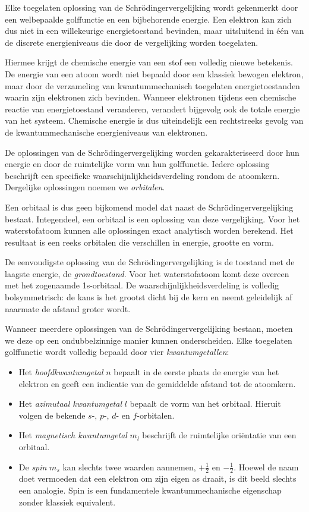 Elke toegelaten oplossing van de Schr\"odingervergelijking wordt gekenmerkt door een welbepaalde golffunctie en een bijbehorende energie. Een elektron kan zich dus niet in een willekeurige energietoestand bevinden, maar uitsluitend in \'e\'en van de discrete energieniveaus die door de vergelijking worden toegelaten.

Hiermee krijgt de chemische energie van een stof een volledig nieuwe betekenis. De energie van een atoom wordt niet bepaald door een klassiek bewogen elektron, maar door de verzameling van kwantummechanisch toegelaten energietoestanden waarin zijn elektronen zich bevinden. Wanneer elektronen tijdens een chemische reactie van energietoestand veranderen, verandert bijgevolg ook de totale energie van het systeem. Chemische energie is dus uiteindelijk een rechtstreeks gevolg van de kwantummechanische energieniveaus van elektronen.

De oplossingen van de Schr\"odingervergelijking worden gekarakteriseerd door hun energie en door de ruimtelijke vorm van hun golffunctie. Iedere oplossing beschrijft een specifieke waarschijnlijkheidsverdeling rondom de atoomkern. Dergelijke oplossingen noemen we \emph{orbitalen}.

Een orbitaal is dus geen bijkomend model dat naast de Schr\"odingervergelijking bestaat. Integendeel, een orbitaal is een oplossing van deze vergelijking. Voor het waterstofatoom kunnen alle oplossingen exact analytisch worden berekend. Het resultaat is een reeks orbitalen die verschillen in energie, grootte en vorm.

De eenvoudigste oplossing van de Schr\"odingervergelijking is de toestand met de laagste energie, de \emph{grondtoestand}. Voor het waterstofatoom komt deze overeen met het zogenaamde 1s-orbitaal. De waarschijnlijkheidsverdeling is volledig bolsymmetrisch: de kans is het grootst dicht bij de kern en neemt geleidelijk af naarmate de afstand groter wordt.

Wanneer meerdere oplossingen van de Schr\"odingervergelijking bestaan, moeten we deze op een ondubbelzinnige manier kunnen onderscheiden. Elke toegelaten golffunctie wordt volledig bepaald door vier \emph{kwantumgetallen}:

\begin{itemize}
\item Het \emph{hoofdkwantumgetal} $n$ bepaalt in de eerste plaats de energie van het elektron en geeft een indicatie van de gemiddelde afstand tot de atoomkern.
\item Het \emph{azimutaal kwantumgetal} $l$ bepaalt de vorm van het orbitaal. Hieruit volgen de bekende $s$-, $p$-, $d$- en $f$-orbitalen.
\item Het \emph{magnetisch kwantumgetal} $m_l$ beschrijft de ruimtelijke ori\"entatie van een orbitaal.
\item De \emph{spin} $m_s$ kan slechts twee waarden aannemen, $+\tfrac{1}{2}$ en $-\tfrac{1}{2}$. Hoewel de naam doet vermoeden dat een elektron om zijn eigen as draait, is dit beeld slechts een analogie. Spin is een fundamentele kwantummechanische eigenschap zonder klassiek equivalent.
\end{itemize}

